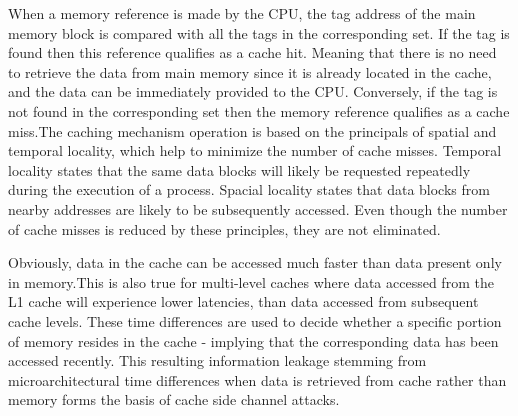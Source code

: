 \documentclass[twocolumn]{IEEEtran}
\begin{document}
When a memory reference is made by the CPU, the tag address of the main memory block is compared with all the tags in the corresponding set. If the tag is found then this reference qualifies as a cache hit. Meaning that there is no need to retrieve the data from main memory since it is already located in the cache, and the data can be immediately provided to the CPU. Conversely, if the tag is not found in the corresponding set then the memory reference qualifies as a cache miss.The caching mechanism operation is based on the principals of spatial and temporal locality, which help to minimize the number of
cache misses. Temporal locality states that the same data blocks will likely be requested repeatedly during the execution of a process. Spacial locality states that data blocks from nearby addresses are likely to be subsequently accessed. Even though the number of cache
misses is reduced by these principles, they are not eliminated.

Obviously, data in the cache can be accessed much faster than data present only in memory.This is also true for multi-level caches where data accessed from the L1 cache will experience lower latencies, than data accessed from subsequent cache levels. These time differences are used to decide whether a specific portion of memory resides in the cache - implying that the corresponding data has been accessed recently. This resulting information leakage stemming from microarchitectural time differences when data is retrieved from cache rather than memory forms the basis of cache side channel attacks.
\end{document}
